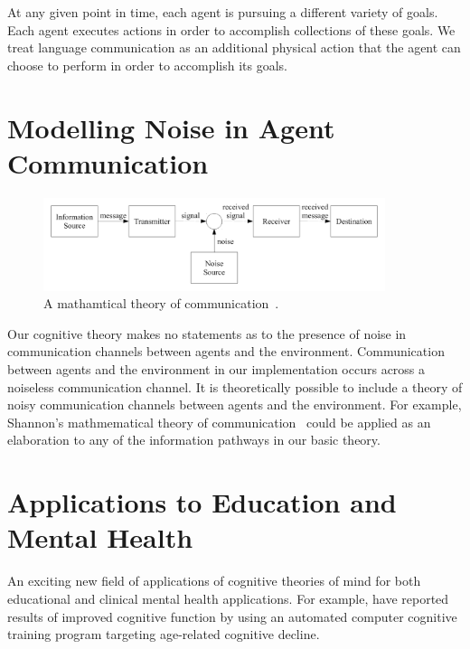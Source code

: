 At any given point in time, each agent is pursuing a different variety
of goals.  Each agent executes actions in order to accomplish
collections of these goals.  We treat language communication as an
additional physical action that the agent can choose to perform in
order to accomplish its goals.

\section{Modelling Noise in Agent Communication}

\begin{figure}[bth]
  \center
  \includegraphics[width=10cm]{gfx/communication_theory}
  \caption[A mathematical theory of communication]{A mathamtical
    theory of communication~\citep{shannon:1959}.}
  \label{fig:communication_theory}
\end{figure}

Our cognitive theory makes no statements as to the presence of noise
in communication channels between agents and the environment.
Communication between agents and the environment in our implementation
occurs across a noiseless communication channel.  It is theoretically
possible to include a theory of noisy communication channels between
agents and the environment.  For example, Shannon's mathmematical
theory of communication~\citep{shannon:1959} could be applied as an
elaboration to any of the information pathways in our basic theory.


%
%

\section{Applications to Education and Mental Health}

An exciting new field of applications of cognitive theories of mind
for both educational and clinical mental health applications.  For
example, \cite{mahncke:2006} have reported results of improved
cognitive function by using an automated computer cognitive training
program targeting age-related cognitive decline.

